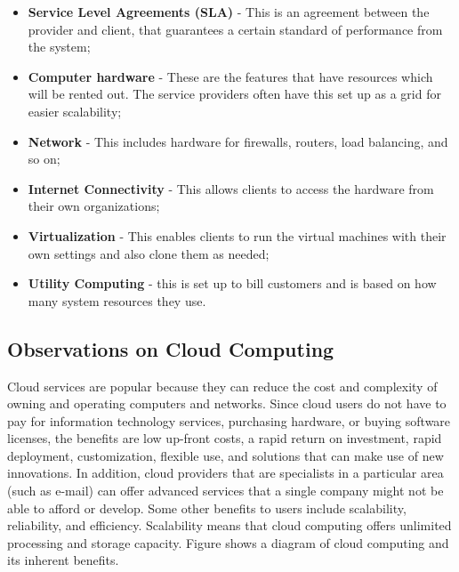 \begin{enumerate}
\begin{itemize}

\item \textbf{Service Level Agreements (SLA)} - This is an agreement between the provider and client, that guarantees a certain standard of performance from the system;

\item \textbf{Computer hardware} - These are the features that have resources which will be rented out. The service providers often have this set up as a grid for easier scalability;

\item \textbf{Network} - This includes hardware for firewalls, routers, load balancing, and so on;

\item \textbf{Internet Connectivity} - This allows clients to access the hardware from their own organizations;

\item \textbf{Virtualization} - This enables clients to run the virtual machines with their own settings and also clone them as needed;

\item \textbf{Utility Computing} - this is set up to bill customers and is based on how many system resources they use.
\end{itemize}
\end{enumerate}
\subsection{Observations on Cloud Computing}

Cloud services are popular because they can reduce the cost and complexity of owning and operating computers and networks. Since cloud users do not have to pay for information technology services, purchasing hardware, or buying software licenses, the benefits are low up-front costs, a rapid return on investment, rapid deployment, customization, flexible use, and solutions that can make use of new innovations. In addition, cloud providers that are specialists in a particular area (such as e-mail) can offer advanced services that a single company might not be able to afford or develop. Some other benefits to users include scalability, reliability, and efficiency. Scalability means that cloud computing offers unlimited processing and storage capacity. Figure  shows a diagram of cloud computing and its inherent benefits.


